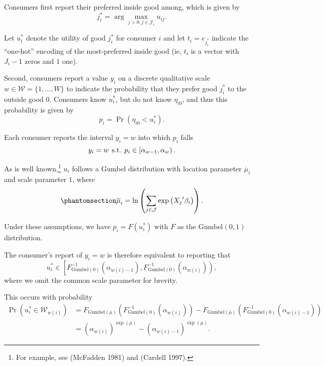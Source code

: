 \documentclass[
]{article}
\begin{document}
Consumers first report their preferred inside good among, which is given
by \[
j^*_i = \arg\max_{j>0; j \in \mathcal{J}_i} u_{ij}.
\]

Let \(u_i^*\) denote the utility of good \(j^*_i\) for consumer \(i\)
and let \(t_i = e_{j_i^*}\) indicate the ``one-hot'' encoding of the
most-preferred inside good (ie, \(t_i\) is a vector with \(J_i-1\) zeros
and \(1\) one).

Second, consumers report a value \(y_i\) on a discrete qualitative scale
\(w \in \mathcal{W} = \lbrace 1, \ldots, W \rbrace\) to indicate the
probability that they prefer good \(j^*_i\) to the outside good 0.
Consumers know \(u_i^*\), but do not know \(\eta_{i0}\), and thus this
probability is given by \[
p_i = \Pr \left( \eta_{i0} < u_i^* \right).
\]

Each consumer reports the interval \(y_i=w\) into which \(p_i\) falls \[
y_i = w \hspace{1ex} \text{s.t.} \hspace{1ex} p_i \in \left[\alpha_{w-1},\alpha_w\right).
\]

As is well known,\footnote{For example, see (McFadden 1981) and (Cardell
  1997).} \(u_i\) follows a Gumbel distribution with location parameter
\(\overline{\mu}_i\) and scale parameter \(1\), where
\begin{equation}\phantomsection\label{eq-max-mu}{
\overline{\mu}_i = \ln\left( \sum_{j\in\mathcal{J}} \exp\left({X_j}'\beta_i\right)\right).
}\end{equation}

Under these assumptions, we have \(p_i = F\left( u_i^* \right)\) with
\(F\) as the \(\text{Gumbel} \left( 0,1 \right)\) distribution.

The consumer's report of \(y_i=w\) is therefore equivalent to reporting
that \[
    u_i^* \in \left[
        F^{-1}_{\text{Gumbel}\left(0\right)}\left(\alpha_{w\left(i\right)-1}\right),
        F^{-1}_{\text{Gumbel}\left(0\right)}\left(\alpha_{w\left(i\right)}\right)
    \right),
\] where we omit the common scale parameter for brevity.

This occurs with probability \[
\begin{aligned}
    \Pr \left( u_i^* \in \mathcal{W}_{w\left( i \right)} \right) 
    &= F_{\text{Gumbel} \left( \overline{ \mu } \right) } \left( F^{-1}_{\text{Gumbel} \left( 0 \right) } \left( \alpha_{w \left( i \right)} \right) \right) - 
       F_{\text{Gumbel} \left( \overline{ \mu } \right) } \left( F^{-1}_{\text{Gumbel} \left( 0 \right) } \left( \alpha_{w \left( i \right) - 1} \right) \right) \\
    &= \left( \alpha_{w \left( i \right)} \right)^{\exp \left( \overline{\mu} \right)} - 
       \left({\alpha_{w \left( i \right)-1}} \right)^{\exp \left( \overline{\mu} \right)}.
\end{aligned}
\]
\end{document}
